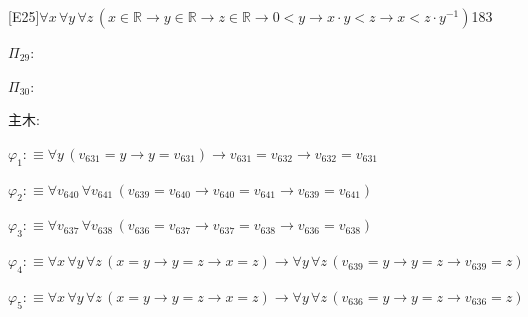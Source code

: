 \begin{fullproof}{[E25]}{$\forall x\,\forall y\,\forall z\,(x \in \mathbb{R} \to y \in \mathbb{R} \to z \in \mathbb{R} \to 0 < y \to x \cdot y < z \to x < z \cdot y^{-1})$}{183}
\begin{ptree}
\end{ptree}
\noindent$\Pi_{29}$:
\begin{ptree}
\noLine
{}
\noLine
{}
\end{ptree}
\noindent$\Pi_{30}$:
\begin{ptree}
\noLine
{}
\noLine
{}
\noLine
{}
\end{ptree}
\noindent 主木:
\begin{ptree}
\noLine
{}
\noLine
{}
\end{ptree}
\begin{abbrevlist}
\item $\varphi_{1} :\equiv \forall y\,(v_{631} = y \to y = v_{631}) \to v_{631} = v_{632} \to v_{632} = v_{631}$
\item $\varphi_{2} :\equiv \forall v_{640}\,\forall v_{641}\,(v_{639} = v_{640} \to v_{640} = v_{641} \to v_{639} = v_{641})$
\item $\varphi_{3} :\equiv \forall v_{637}\,\forall v_{638}\,(v_{636} = v_{637} \to v_{637} = v_{638} \to v_{636} = v_{638})$
\item $\varphi_{4} :\equiv \forall x\,\forall y\,\forall z\,(x = y \to y = z \to x = z) \to \forall y\,\forall z\,(v_{639} = y \to y = z \to v_{639} = z)$
\item $\varphi_{5} :\equiv \forall x\,\forall y\,\forall z\,(x = y \to y = z \to x = z) \to \forall y\,\forall z\,(v_{636} = y \to y = z \to v_{636} = z)$

\end{abbrevlist}
\end{fullproof}
